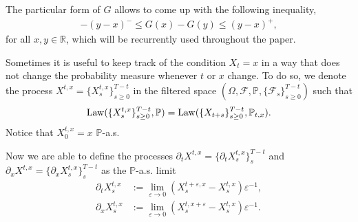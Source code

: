 \documentclass{tufte-handout}
\renewcommand{\Pr}{\mathbb{P}} %
\newcommand{\R}{\mathbb{R}} %
\begin{document}
	The particular form of $G$ allows to come up with the following inequality,
	\begin{align}\label{eq:G_inequality}
	-(y - x)^- \leq G(x) - G(y) \leq (y - x)^+, 
	\end{align}
	for all $x, y \in \R$, which will be recurrently used throughout the paper.
	
	Sometimes it is useful to keep track of the condition $X_t = x$ in a way that does not change the probability measure whenever $t$ or $x$ change. To do so, we denote the process $X^{t, x} = \{X_s^{t, x}\}_{s\geq 0}^{T - t}$ in the filtered space $(\Omega, \mathcal{F}, \Pr, \{\mathcal{F}_s\}_{s\geq 0}^{T - t})$ such that
	\begin{align}\label{eq:lawX^{t,x}-X}
		\mathrm{Law}(\{X_s^{t, x}\}_{s\geq0}^{T - t}, \Pr) = \mathrm{Law}(\{X_{t + s}\}_{s\geq 0}^{T - t}, \Pr_{t, x}).	
	\end{align}
	Notice that $X_0^{t,x} = x$ $\Pr$-a.s. 
	
	Now we are able to define the processes $\partial_t X^{t, x} = \{\partial_t X_s^{t, x}\}_{s}^{T - t}$ and $\partial_x X^{t, x} = \{\partial_x X_s^{t, x}\}_{s}^{T - t}$ as the $\Pr$-a.s. limit
	\begin{align*}
	\partial_t X_s^{t, x} &:= \lim_{\varepsilon\rightarrow 0} \left(X_s^{t + \varepsilon, x} - X_s^{t, x}\right)\varepsilon^{-1}, \\
	\partial_x X_s^{t, x} &:= \lim_{\varepsilon\rightarrow 0} \left(X_s^{t, x + \varepsilon} - X_s^{t, x}\right)\varepsilon^{-1}.
	\end{align*}
	
\end{document}
